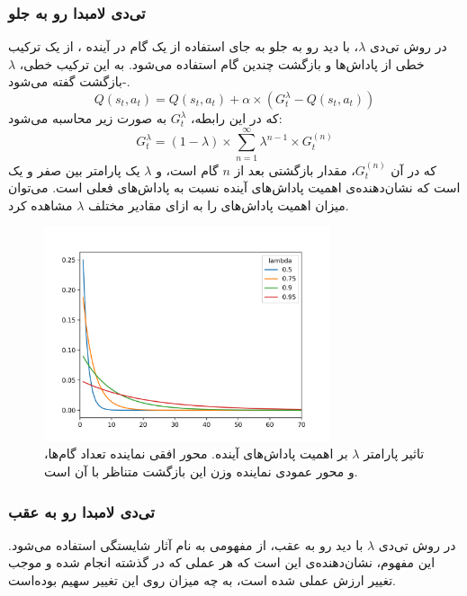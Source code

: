 \subsubsection{ تی‌دی لامبدا رو به جلو}
در روش تی‌دی $\lambda$،
با دید رو به جلو
به جای استفاده از یک گام در آینده ، از یک ترکیب خطی از پاداش‌ها و بازگشت چندین گام استفاده می‌شود.
به این ترکیب خطی، $\lambda$-بازگشت  گفته می‌شود.
\begin{equation}\label{eq:td_lambda_q_function}
    Q(s_t, a_t) = Q(s_t, a_t) + \alpha \times (G_t^\lambda - Q(s_t, a_t))
\end{equation}
که در این رابطه، $G_t^\lambda$
به صورت زیر محاسبه می‌شود:
\begin{equation}\label{eq:td_lambda_return}
    G_t^\lambda = (1-\lambda)\times\sum_{n=1}^\infty \lambda^{n-1} \times G_t^{(n)}
\end{equation}
که در آن $G_t^{(n)}$، 
مقدار بازگشتی بعد از $n$ گام است،
و $\lambda$
یک پارامتر بین صفر و یک است که نشان‌دهنده‌ی اهمیت پاداش‌های آینده نسبت به پاداش‌های فعلی است.
می‌توان میزان اهمیت پاداش‌های را به ازای مقادیر مختلف $\lambda$ مشاهده کرد.
\begin{figure}[H]
    \centering
    \includegraphics[width=0.75\textwidth]{images/lambda_return_weight.png}
    \caption{تاثیر پارامتر  $\lambda$ بر اهمیت پاداش‌های آینده. 
    محور افقی نماینده تعداد گام‌ها، و محور عمودی نماینده وزن این بازگشت متناظر با آن است.}\label{fig:td_lambda}
    
\end{figure}
\subsubsection{تی‌دی لامبدا رو به عقب}
در روش تی‌دی $\lambda$ با دید رو به عقب،
از مفهومی به نام آثار شایستگی  استفاده می‌شود.
این مفهوم، نشان‌دهنده‌ی این است که هر عملی که در گذشته انجام شده و موجب تغییر ارزش عملی شده است،  به چه میزان روی این تغییر سهیم بوده‌است.

